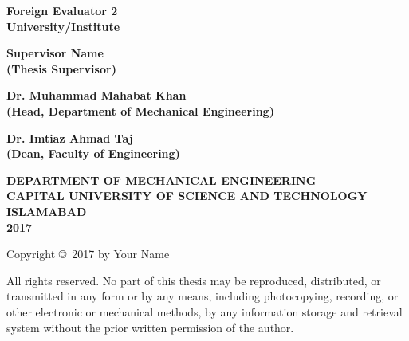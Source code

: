 \documentclass
[a4paper, 12pt, oneside]{Thesis}  %
\begin{document}
\vspace{0.5cm}

\begin{center}
\textbf{Foreign Evaluator 2}\\
\textbf{University/Institute}
\end{center}

\vspace{0.5cm}

\begin{center}
\textbf{Supervisor Name}\\
\textbf{(Thesis Supervisor)}
\end{center}

\vspace{0.5cm}

\begin{center}
\textbf{Dr. Muhammad Mahabat Khan}\\
\textbf{(Head, Department of Mechanical Engineering)}
\end{center}

\vspace{0.5cm}

\begin{center}
\textbf{Dr. Imtiaz Ahmad Taj}\\
\textbf{(Dean, Faculty of Engineering)}
\end{center}

\vspace{2cm}

\begin{center}
\textbf{DEPARTMENT OF MECHANICAL ENGINEERING\\
CAPITAL UNIVERSITY OF SCIENCE AND TECHNOLOGY\\
ISLAMABAD\\
2017}
\end{center}

\clearpage


\pagestyle{fancy}

\begin{center}
\large{Copyright \copyright~2017 by Your Name}
\end{center}

All rights reserved. No part of this thesis may be reproduced, distributed, or transmitted in any form or by any means, including photocopying, recording, or other electronic or mechanical methods, by any information storage and retrieval system without the prior written permission of the author.

\clearpage
\end{document}
